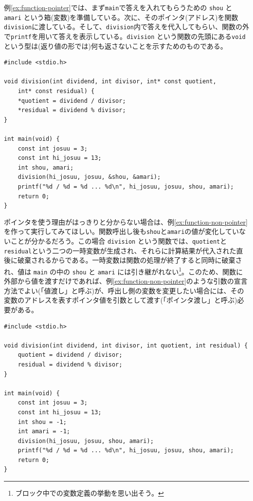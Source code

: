 例\ref{ex:function-pointer}では、まず\texttt{main}で答えを入れてもらうための \texttt{shou} と \texttt{amari} という箱(変数)を準備している。次に、そのポインタ(アドレス)を関数\texttt{division}に渡している。そして、\texttt{division}内で答えを代入してもらい、関数の外で\texttt{printf}を用いて答えを表示している。\texttt{division} という関数の先頭にある\texttt{void}という型は(返り値の形では)何も返さないことを示すためのものである。
\begin{reidai}\label{ex:function-pointer}
    \begin{verbatim}
#include <stdio.h>

void division(int dividend, int divisor, int* const quotient,
    int* const residual) {
    *quotient = dividend / divisor;
    *residual = dividend % divisor;
}

int main(void) {
    const int josuu = 3;
    const int hi_josuu = 13;
    int shou, amari;
    division(hi_josuu, josuu, &shou, &amari);
    printf("%d / %d = %d ... %d\n", hi_josuu, josuu, shou, amari);
    return 0;
}
\end{verbatim}
\end{reidai} \noindent
ポインタを使う理由がはっきりと分からない場合は、例\ref{ex:function-non-pointer}を作って実行してみてほしい。関数呼出し後も\texttt{shou}と\texttt{amari}の値が変化していないことが分かるだろう。この場合 \texttt{division} という関数では、\texttt{quotient}と\texttt{residual}という二つの一時変数が生成され、それらに計算結果が代入された直後に破棄されるからである。一時変数は関数の処理が終了すると同時に破棄され、値は \texttt{main} の中の \texttt{shou} と \texttt{amari} には引き継がれない\footnote{ブロック中での変数定義の挙動を思い出そう。}。このため、関数に外部から値を渡すだけであれば、例\ref{ex:function-non-pointer}のような引数の宣言方法でよい(「値渡し」と呼ぶ)が、呼出し側の変数を変更したい場合には、その変数のアドレスを表すポインタ値を引数として渡す(「ポインタ渡し」と呼ぶ)必要がある。
\begin{reidai}\label{ex:function-non-pointer}
    \begin{verbatim}
#include <stdio.h>

void division(int dividend, int divisor, int quotient, int residual) {
    quotient = dividend / divisor;
    residual = dividend % divisor;
}

int main(void) {
    const int josuu = 3;
    const int hi_josuu = 13;
    int shou = -1;
    int amari = -1;
    division(hi_josuu, josuu, shou, amari);
    printf("%d / %d = %d ... %d\n", hi_josuu, josuu, shou, amari);
    return 0;
}
\end{verbatim}
\end{reidai}

